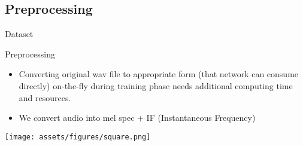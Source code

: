\subsection{Preprocessing}
\begin{frame}{Dataset}
    \begin{block}{Preprocessing}
        \begin{itemize}
            \item Converting original wav file to appropriate form (that network can consume directly) on-the-fly during training phase needs additional computing time and resources.
            \item We convert audio into mel spec + IF (Instantaneous Frequency)
        \end{itemize}
        \centering
        \texttt{[image: assets/figures/square.png]}
    \end{block}
\end{frame}